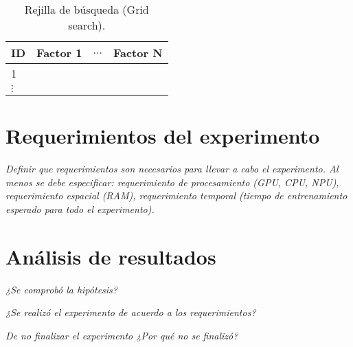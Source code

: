 \documentclass[11pt,twoside,letterpaper]{article}
\begin{document}
\begin{table}[h]
\centering
\begin{tabular}{|l|l|l|l|}
\hline
ID                    & Factor 1 & $\dots$ & Factor N \\ \hline
1                     &          &                      &           \\ \hline
$\vdots$ &          &                      &               \\ \hline
\end{tabular}
\caption{Rejilla de búsqueda (Grid search).}
\end{table}

\section{Requerimientos del experimento}

\emph{Definir que requerimientos son necesarios para llevar a cabo el experimento. Al menos se debe especificar: requerimiento de procesamiento (GPU, CPU, NPU), requerimiento espacial (RAM), requerimiento temporal (tiempo de entrenamiento esperado para todo el experimento).}


\section{Análisis de resultados}

\emph{¿Se comprobó la hipótesis?}

\emph{¿Se realizó el experimento de acuerdo a los requerimientos?}

\emph{De no finalizar el experimento ¿Por qué no se finalizó?}



\newpage

\end{document}
